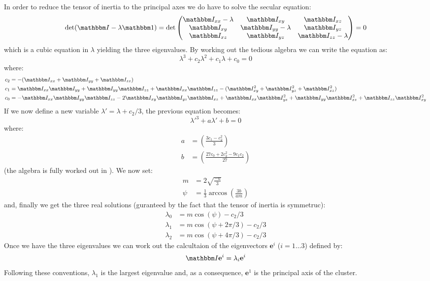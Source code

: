 \documentclass[a4paper,11pt]{article}
\newcommand{\itm}{\mathbbm I}
\newcommand{\itc}[1]{\itm_{#1}}
\begin{document}
In order to reduce the tensor of inertia to the principal axes we do have to
solve the secular equation:
\begin{equation}
  \det(\itm - \lambda{\mathbbm 1}) =
  \det\begin{pmatrix}
  \itc{xx} - \lambda & \itc{xy} & \itc{xz}\\
  \itc{xy} & \itc{yy} - \lambda & \itc{yz}\\
  \itc{xz} & \itc{yz} & \itc{zz} - \lambda
  \end{pmatrix} = 0
\end{equation}
which is a cubic equation  in $\lambda$ yielding the three eigenvalues.
By working out the tedious algebra we can write the equation as:
$$
\lambda^3 + c_2\lambda^2 + c_1\lambda + c_0 = 0
$$
where:
\begin{align}
  c_2 &= -(\itc{xx} + \itc{yy} + \itc{zz})\\
  c_1 &= \itc{xx}\itc{yy} + \itc{yy}\itc{zz} + \itc{xx}\itc{zz} -
  (\itc{xy}^2 + \itc{yz}^2 + \itc{xz}^2)\\
  c_0 &= -\itc{xx}\itc{yy}\itc{zz} - 2\itc{xy}\itc{yz}\itc{xz} +
  \itc{xx}\itc{yz}^2 + \itc{yy}\itc{xz}^2 + \itc{zz}\itc{xy}^2
\end{align}
If we now define a new variable $\lambda' = \lambda + c_2/3$, the previous
equation becomes:
$$
\lambda'^3 + a\lambda' + b = 0
$$
where:
\begin{align}
  a &= \left(\frac{3c_1 - c_2^2}{3}\right)\\
  b &= \left(\frac{27c_0 + 2c_2^2 - 9c_1c_2}{27}\right)
\end{align}
(the algebra is fully worked out in \cite{wolfram}).
We now set:
\begin{align}
  m &= 2\sqrt{\frac{-a}{3}}\\
  \psi &= \frac{1}{3}\arccos\left(\frac{3b}{am}\right)
\end{align}
and, finally we get the three real solutions (guranteed by the fact that the
tensor of inertia is symmetruc):
\begin{align}
  \lambda_0 &= m\cos(\psi) - c_2/3\\
  \lambda_1 &= m\cos(\psi + 2\pi/3) - c_2/3\\
  \lambda_2 &= m\cos(\psi + 4\pi/3) - c_2/3
\end{align}
Once we have the three eigenvalues we can work out the calcultaion of the
eigenvectors $\mathbf{e}^i$ ($i = 1\ldots3$) defined by:
$$
\itm\mathbf{e}^i = \lambda_i\mathbf{e}^i
$$
Following these conventions, $\lambda_1$ is the largest eigenvalue and,
as a consequence, $\mathbf{e}^1$ is the principal axis of the cluster.
\end{document}
